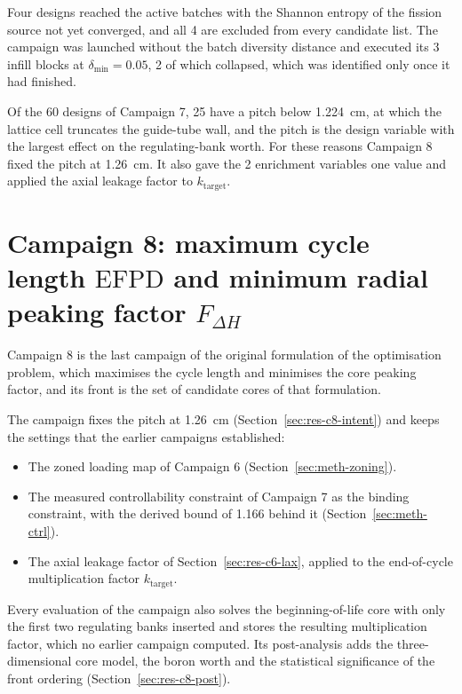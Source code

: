 Four designs reached the active batches with the Shannon entropy of
the fission source not yet converged, and all 4 are excluded from
every candidate list. The campaign was launched without the batch
diversity distance and executed its 3 infill blocks at
$\delta_\mathrm{min} = 0.05$, 2 of which collapsed, which was
identified only once it had finished.

Of the 60 designs of Campaign 7, 25 have a pitch below \SI{1.224}{cm},
at which the lattice cell truncates the guide-tube wall, and the pitch
is the design variable with the largest effect on the regulating-bank
worth. For these reasons Campaign 8 fixed the pitch at \SI{1.26}{cm}.
It also gave the 2 enrichment variables one value and applied the axial
leakage factor to $k_\mathrm{target}$.

\section{Campaign 8: maximum cycle length \texorpdfstring{$\mathrm{EFPD}$}{EFPD} and minimum radial peaking factor \texorpdfstring{$F_{\Delta H}$}{F dH}}
\label{sec:res-c8}

Campaign 8 is the last campaign of the original formulation of the
optimisation problem, which maximises the cycle length and minimises the core peaking factor, and
its front is the set of candidate cores of that formulation.

The campaign fixes the pitch at \SI{1.26}{cm}
(Section~\ref{sec:res-c8-intent}) and keeps the settings that the
earlier campaigns established:

\begin{itemize}
  \item The zoned loading map of Campaign 6
        (Section~\ref{sec:meth-zoning}).

  \item The measured controllability constraint of Campaign 7 as the
        binding constraint, with the derived bound of 1.166 behind it
        (Section~\ref{sec:meth-ctrl}).

  \item The axial leakage factor of Section~\ref{sec:res-c6-lax},
        applied to the end-of-cycle multiplication factor $k_\mathrm{target}$.
\end{itemize}

Every evaluation of the campaign also solves the beginning-of-life core
with only the first two regulating banks inserted and stores the resulting multiplication factor, which no earlier campaign computed.
Its post-analysis adds the three-dimensional core model, the boron worth
and the statistical significance of the front ordering
(Section~\ref{sec:res-c8-post}).

